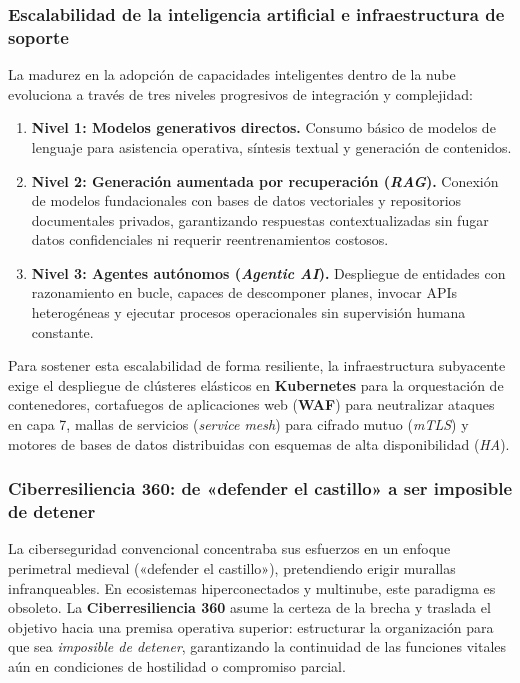\subsubsection*{\textcolor{unabblue}{}\quad Escalabilidad de la inteligencia artificial e infraestructura de soporte}
La madurez en la adopción de capacidades inteligentes dentro de la nube evoluciona a través de tres niveles progresivos de integración y complejidad:
\begin{enumerate}
  \item \textbf{Nivel 1: Modelos generativos directos.} Consumo básico de modelos de lenguaje para asistencia operativa, síntesis textual y generación de contenidos.
  \item \textbf{Nivel 2: Generación aumentada por recuperación (\textit{RAG}).} Conexión de modelos fundacionales con bases de datos vectoriales y repositorios documentales privados, garantizando respuestas contextualizadas sin fugar datos confidenciales ni requerir reentrenamientos costosos.
  \item \textbf{Nivel 3: Agentes autónomos (\textit{Agentic AI}).} Despliegue de entidades con razonamiento en bucle, capaces de descomponer planes, invocar APIs heterogéneas y ejecutar procesos operacionales sin supervisión humana constante.
\end{enumerate}

Para sostener esta escalabilidad de forma resiliente, la infraestructura subyacente exige el despliegue de clústeres elásticos en \textbf{Kubernetes} para la orquestación de contenedores, cortafuegos de aplicaciones web (\textbf{WAF}) para neutralizar ataques en capa 7, mallas de servicios (\textit{service mesh}) para cifrado mutuo (\textit{mTLS}) y motores de bases de datos distribuidas con esquemas de alta disponibilidad (\textit{HA}).

\subsubsection*{\textcolor{unabblue}{}\quad Ciberresiliencia 360: de «defender el castillo» a ser imposible de detener}
La ciberseguridad convencional concentraba sus esfuerzos en un enfoque perimetral medieval («defender el castillo»), pretendiendo erigir murallas infranqueables. En ecosistemas hiperconectados y multinube, este paradigma es obsoleto. La \textbf{Ciberresiliencia 360} asume la certeza de la brecha y traslada el objetivo hacia una premisa operativa superior: estructurar la organización para que sea \textit{imposible de detener}, garantizando la continuidad de las funciones vitales aún en condiciones de hostilidad o compromiso parcial.

